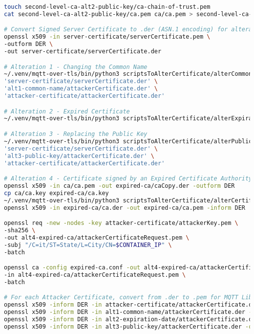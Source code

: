 \documentclass[binding=0.6cm,noexaminfo]{sapthesis}
\begin{document}
\begin{lstlisting}[language=Bash]
touch second-level-ca-alt2-public-key/ca-chain-of-trust.pem
cat second-level-ca-alt2-public-key/ca.pem ca/ca.pem > second-level-ca-alt2-public-key/ca-chain-of-trust.pem

# Convert Signed Server Certificate to .der (ASN.1 encoding) for alteration purposes
openssl x509 -in server-certificate/serverCertificate.pem \
-outform DER \
-out server-certificate/serverCertificate.der

# Alteration 1 - Changing the Common Name
~/.venv/mqtt-over-tls/bin/python3 scriptsToAlterCertificate/alterCommonName.py \
'server-certificate/serverCertificate.der' \
'alt1-common-name/attackerCertificate.der' \
'attacker-certificate/attackerCertificate.der'

# Alteration 2 - Expired Certificate
~/.venv/mqtt-over-tls/bin/python3 scriptsToAlterCertificate/alterExpirationDate.py

# Alteration 3 - Replacing the Public Key
~/.venv/mqtt-over-tls/bin/python3 scriptsToAlterCertificate/alterPublicKey.py \
'server-certificate/serverCertificate.der' \
'alt3-public-key/attackerCertificate.der' \
'attacker-certificate/attackerCertificate.der'

# Alteration 4 - Certificate signed by an Expired Certificate Authority Certificate
openssl x509 -in ca/ca.pem -out expired-ca/caCopy.der -outform DER
cp ca/ca.key expired-ca/ca.key
~/.venv/mqtt-over-tls/bin/python3 scriptsToAlterCertificate/alterCertificateAuthorityExpirationDate.py
openssl x509 -in expired-ca/ca.der -out expired-ca/ca.pem -inform DER

openssl req -new -nodes -key attacker-certificate/attackerKey.pem \
-sha256 \
-out alt4-expired-ca/attackerCertificateRequest.pem \
-subj "/C=it/ST=State/L=City/CN=$CONTAINER_IP" \
-batch

openssl ca -config expired-ca.conf -out alt4-expired-ca/attackerCertificate.pem \
-in alt4-expired-ca/attackerCertificateRequest.pem \
-batch

# For each Attacker Certificate, convert from .der to .pem for MQTT Library
openssl x509 -inform DER -in attacker-certificate/attackerCertificate.der -out attacker-certificate/attackerCertificate.pem
openssl x509 -inform DER -in alt1-common-name/attackerCertificate.der -out alt1-common-name/attackerCertificate.pem
openssl x509 -inform DER -in alt2-expiration-date/attackerCertificate.der -out alt2-expiration-date/attackerCertificate.pem
openssl x509 -inform DER -in alt3-public-key/attackerCertificate.der -out alt3-public-key/attackerCertificate.pem
\end{lstlisting}
\end{document}
